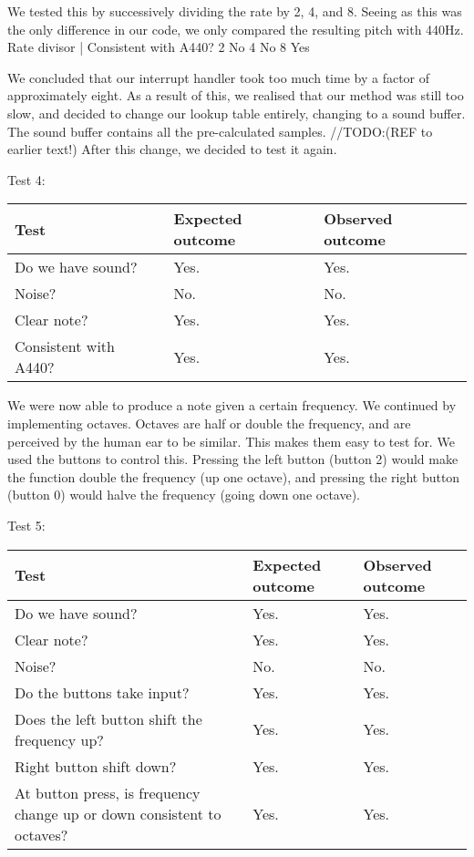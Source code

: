 We tested this by successively dividing the rate by 2, 4, and 8. Seeing as this was the only difference in our code, we only compared the resulting pitch with 440Hz.
Rate divisor  |	Consistent with A440?
2 				No
4				No
8				Yes

We concluded that our interrupt handler took too much time by a factor
of approximately eight. As a result of this, we realised that our method
was still too slow, and decided to change our lookup table entirely,
changing to a sound buffer. The sound buffer contains all the
pre-calculated samples. //TODO:(REF to earlier text!) After this change,
we decided to test it again.

Test 4:
\begin{center}
\begin{tabular}{|p{3.6cm}|p{3.6cm}|p{3.6cm}|}
\hline
{\sc Test} & {\sc Expected outcome} & {\sc Observed outcome}\\ \hline
Do we have sound? & Yes. & Yes. \\ \hline
Noise? & No. & No. \\ \hline
Clear note? & Yes. & Yes. \\ \hline
Consistent with A440? & Yes. & Yes. \\ \hline
\end{tabular}
\end{center}

We were now able to produce a note given a certain frequency. We
continued by implementing octaves. Octaves are half or double the
frequency, and are perceived by the human ear to be similar. This makes
them easy to test for. We used the buttons to control this. Pressing the
left button (button 2) would make the function double the frequency (up
one octave), and pressing the right button (button 0) would halve the
frequency (going down one octave).

Test 5:
\begin{center}
\begin{tabular}{|p{3.6cm}|p{3.6cm}|p{3.6cm}|}
\hline
{\sc Test} & {\sc Expected outcome} & {\sc Observed outcome}\\ \hline
Do we have sound? & Yes. & Yes. \\ \hline
Clear note? & Yes. & Yes. \\ \hline
Noise? & No. & No. \\ \hline
Do the buttons take input? & Yes. & Yes. \\ \hline
Does the left button shift the frequency up? & Yes. & Yes. \\ \hline
Right button shift down? & Yes. & Yes. \\ \hline
At button press, is frequency change up or down consistent to octaves? &
Yes. & Yes. \\ \hline
\end{tabular}
\end{center}

